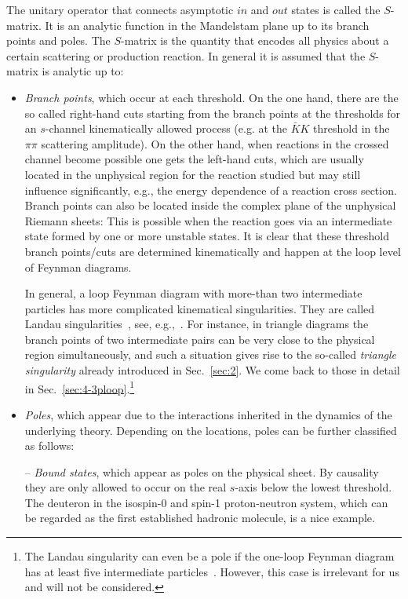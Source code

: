 The unitary operator that connects asymptotic $in$ and $out$ states is called
the $S$-matrix.
It is an analytic function in the Mandelstam plane
 up to its branch points and poles.
 The $S$-matrix is the quantity that encodes all physics about a certain
 scattering or production reaction. In general it is
assumed that the $S$-matrix is analytic up to:
\begin{itemize}
 
\item {\it Branch points}, which occur at each threshold. On the one hand, there
are the so called right-hand cuts starting from the branch points at the
thresholds for an $s$-channel kinematically allowed process (e.g. at the $\bar
KK$ threshold in the $\pi \pi$ scattering amplitude). On the other hand, when
reactions in the crossed channel become possible one gets the left-hand cuts,
which are usually located in the unphysical region for the reaction studied but
may still influence significantly, e.g., the energy dependence of a reaction
cross section. Branch points can also be located inside the complex plane of 
the unphysical Riemann sheets: This is possible when the reaction goes via an 
intermediate state formed by one or more unstable states. It is clear that these
threshold branch points/cuts are determined kinematically and happen at the loop
level of Feynman diagrams.

In general, a loop Feynman diagram with more-than two intermediate particles has
more complicated kinematical singularities. They are called Landau
singularities~\cite{Landau:1959fi}, see,
e.g.,~\cite{Eden:1966,Chang:1983,Gribov:2009}.
For instance, in triangle diagrams the branch points of two intermediate pairs
can be very close to the physical region simultaneously, and such a situation
gives rise to the so-called {\it triangle singularity} already introduced
in Sec.~\ref{sec:2}. We come back to those in detail in
Sec.~\ref{sec:4-3ploop}.\footnote{The Landau singularity can even be a pole if
the one-loop Feynman diagram has at least five intermediate
particles~\cite{Gribov:2009}. However, this case is irrelevant for us and will
not be considered.}

\item {\it Poles}, which appear due to the interactions inherited in the
dynamics of the underlying theory. Depending on the locations, poles can be
further classified as follows:

-- {\it Bound states}, which appear as poles on the physical sheet. By causality
they are only allowed to occur on the real $s$-axis below the lowest threshold.
The deuteron in the isospin-0 and spin-1 proton-neutron system, which can be
regarded as the first established hadronic molecule, is a nice example.


\end{itemize}
